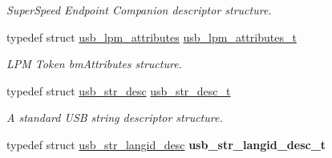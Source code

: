 \begin{DoxyCompactItemize}
\begin{DoxyCompactList}\small\item\em Super\+Speed Endpoint Companion descriptor structure. \end{DoxyCompactList}\item 
\mbox{\label{group__usb__protocol__group_ga1230c50391f0fa32f767a3f1e61b13a3}} 
typedef struct \hyperlink{structusb__lpm__attributes}{usb\+\_\+lpm\+\_\+attributes} \hyperlink{group__usb__protocol__group_ga1230c50391f0fa32f767a3f1e61b13a3}{usb\+\_\+lpm\+\_\+attributes\+\_\+t}
\begin{DoxyCompactList}\small\item\em L\+PM Token bm\+Attributes structure. \end{DoxyCompactList}\item 
\mbox{\label{group__usb__protocol__group_ga71edff7a33abb868e08e9243e7ea7c45}} 
typedef struct \hyperlink{structusb__str__desc}{usb\+\_\+str\+\_\+desc} \hyperlink{group__usb__protocol__group_ga71edff7a33abb868e08e9243e7ea7c45}{usb\+\_\+str\+\_\+desc\+\_\+t}
\begin{DoxyCompactList}\small\item\em A standard U\+SB string descriptor structure. \end{DoxyCompactList}\item 
\mbox{\label{group__usb__protocol__group_gab3fa823b49c5e868018c3deea103990b}} 
typedef struct \hyperlink{structusb__str__langid__desc}{usb\+\_\+str\+\_\+langid\+\_\+desc} {\bfseries usb\+\_\+str\+\_\+langid\+\_\+desc\+\_\+t}
\end{DoxyCompactItemize}
